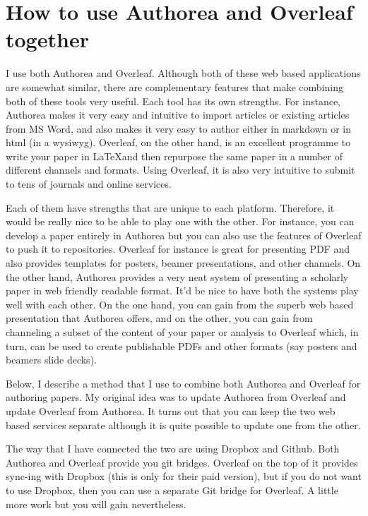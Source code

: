 \section{How to use Authorea and Overleaf together}

I use both Authorea and Overleaf. Although both of these web based applications are somewhat similar, there are complementary features that make combining both of these tools very useful. Each tool has its own strengths. For instance, Authorea makes it very easy and intuitive to import articles or existing articles from MS Word, and also makes it very easy to author either in markdown or in html (in a wysiwyg). Overleaf, on the other hand, is an excellent programme to write your paper in \LaTeX and then repurpose the same paper in a number of different channels and formats. Using Overleaf, it is also very intuitive to submit to tens of journals and online services. 

Each of them have strengths that are unique to each platform. Therefore, it would be really nice to be able to play one with the other. For instance, you can develop a paper entirely in Authorea but you can also use the features of Overleaf to push it to repositories. Overleaf for instance is great for presenting PDF and also provides templates for posters, beamer presentations, and other channels. On the other hand, Authorea provides a very neat system of presenting a scholarly paper in web friendly readable format. It'd be nice to have both the systems play well with each other. On the one hand, you can gain from the superb web based presentation that Authorea offers, and on the other, you can gain from channeling a subset of the content of your paper or analysis to Overleaf which, in turn, can be used to create publishable PDFs and other formats (say posters and beamers slide decks).  

Below, I describe a method that I use to combine both Authorea and Overleaf for authoring papers. My original idea was to update Authorea from Overleaf and update Overleaf from Authorea. It turns out that you can keep the two web based services separate although it is quite possible to update one from the other. 

The way that I have connected the two are using Dropbox and Github. Both Authorea and Overleaf provide you git bridges. Overleaf on the top of it provides sync-ing with Dropbox (this is only for their paid version), but if you do not want to use Dropbox, then you can use a separate Git bridge for Overleaf. A little more work but you will gain nevertheless. 

